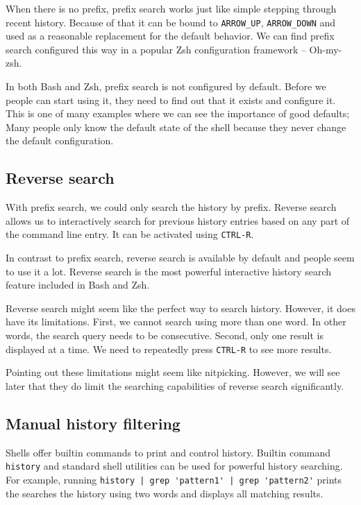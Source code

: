 When there is no prefix, prefix search works just like simple stepping through recent history. Because of that it can be bound to \verb|ARROW_UP|, \verb|ARROW_DOWN| and used as a reasonable replacement for the default behavior. We can find prefix search configured this way in a popular Zsh configuration framework -- Oh-my-zsh\cite{toolsohmyzsh}.

In both Bash and Zsh, prefix search is not configured by default. Before we people can start using it, they need to find out that it exists and configure it. This is one of many examples where we can see the importance of good defaults; Many people only know the default state of the shell because they never change the default configuration.

\subsection{Reverse search}

With prefix search, we could only search the history by prefix.
Reverse search allows us to interactively search for previous history entries based on any part of the command line entry. It can be activated using \verb|CTRL-R|.

In contrast to prefix search, reverse search is available by default and people seem to use it a lot. Reverse search is the most powerful interactive history search feature included in Bash and Zsh.

Reverse search might seem like the perfect way to search history. However, it does have its limitations. First, we cannot search using more than one word. In other words, the search query needs to be consecutive. Second, only one result is displayed at a time. We need to repeatedly press \verb|CTRL-R| to see more results.

Pointing out these limitations might seem like nitpicking. However, we will see later that they do limit the searching capabilities of reverse search significantly.


\subsection{Manual history filtering}

Shells offer builtin commands to print and control history. Builtin command \verb|history| and standard shell utilities can be used for powerful history searching.
For example, running \verb#history | grep 'pattern1' | grep 'pattern2'# prints the searches the history using two words and displays all matching results.

